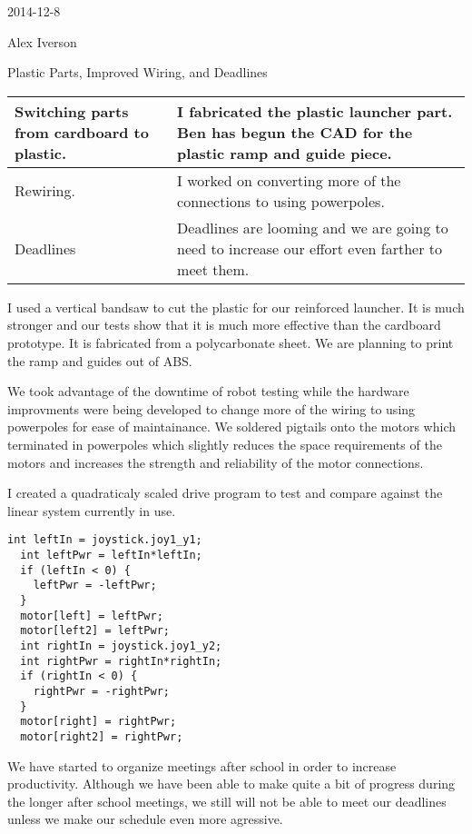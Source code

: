 2014-12-8

Alex Iverson

Plastic Parts, Improved Wiring, and Deadlines

\begin{tabular}{|p{5cm}|p{5cm}|}
 \hline
 Switching parts from cardboard to plastic.&
 I fabricated the plastic launcher part. Ben has begun the CAD for the plastic ramp and guide piece.\\
 \hline
 Rewiring.&
 I worked on converting more of the connections to using powerpoles.\\
 \hline
 Deadlines&
 Deadlines are looming and we are going to need to increase our effort even farther to meet them.\\
 \hline
\end{tabular}

I used a vertical bandsaw to cut the plastic for our reinforced launcher. It is much stronger and our tests show that it is much more effective than the cardboard prototype.
It is fabricated from a polycarbonate sheet. We are planning to print the ramp and guides out of ABS.

We took advantage of the downtime of robot testing while the hardware improvments were being developed to change more of the wiring to using powerpoles for ease of maintainance. We soldered pigtails onto the motors which terminated in powerpoles which slightly reduces the space requirements of the motors and increases the strength and reliability of the motor connections.

I created a quadraticaly scaled drive program to test and compare against the linear system currently in use.

\begin{lstlisting}[style = RobotC]
  int leftIn = joystick.joy1_y1;
  int leftPwr = leftIn*leftIn;
  if (leftIn < 0) {
    leftPwr = -leftPwr;
  }
  motor[left] = leftPwr;
  motor[left2] = leftPwr;
  int rightIn = joystick.joy1_y2;
  int rightPwr = rightIn*rightIn;
  if (rightIn < 0) {
    rightPwr = -rightPwr;
  }
  motor[right] = rightPwr;
  motor[right2] = rightPwr;
\end{lstlisting}


We have started to organize meetings after school in order to increase productivity. Although we have been able to make quite a bit of progress during the longer after school meetings, we still will not be able to meet our deadlines unless we make our schedule even more agressive.